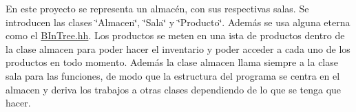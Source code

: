 En este proyecto se representa un almacén, con sus respectivas salas. Se introducen las clases \char`\"{}\+Almacen\char`\"{}, \char`\"{}\+Sala\char`\"{} y \char`\"{}\+Producto\char`\"{}. Además se usa alguna eterna como el \mbox{\hyperlink{bintree_8hh}{B\+In\+Tree.\+hh}}. Los productos se meten en una ista de productos dentro de la clase almacen para poder hacer el inventario y poder acceder a cada uno de los productos en todo momento. Además la clase almacen llama siempre a la clase sala para las funciones, de modo que la estructura del programa se centra en el almacen y deriva los trabajos a otras clases dependiendo de lo que se tenga que hacer. 